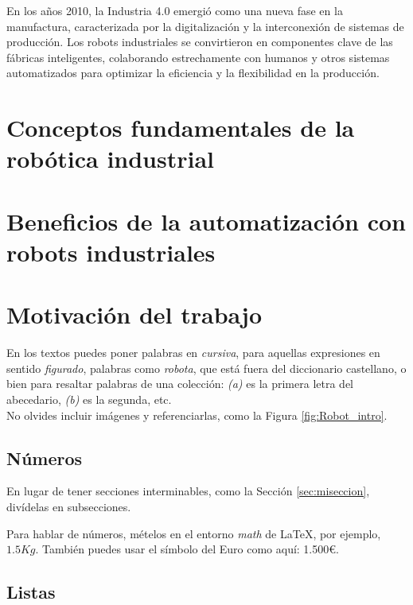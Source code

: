 En los años 2010, la Industria 4.0 emergió como una nueva fase en la manufactura, caracterizada por la digitalización y la interconexión de sistemas de producción. Los robots industriales se convirtieron en componentes clave de las fábricas inteligentes, colaborando estrechamente con humanos y otros sistemas automatizados para optimizar la eficiencia y la flexibilidad en la producción. 




\section{Conceptos fundamentales de la robótica industrial}
\label{sec:terceraseccion}

\section{Beneficios de la automatización con robots industriales}
\label{sec:cuartaseccion}

\section{Motivación del trabajo}
\label{sec:quintaseccion}

En los textos puedes poner palabras en \textit{cursiva}, para aquellas expresiones en sentido \textit{figurado}, palabras como \textit{robota}, que está fuera del diccionario castellano, o bien para resaltar palabras de una colección: \textit{(a)} es la primera letra del abecedario, \textit{(b)} es la segunda, etc.\\



No olvides incluir imágenes y referenciarlas, como la Figura \ref{fig:Robot_intro}.

\subsection{Números}
\label{sec:subseccion}

En lugar de tener secciones interminables, como la Sección \ref{sec:miseccion}, divídelas en subsecciones.

Para hablar de números, mételos en el entorno \textit{math} de \LaTeX, por ejemplo, $1.5Kg$. También puedes usar el símbolo del Euro como aquí: 1.500\euro.

\subsection{Listas}

